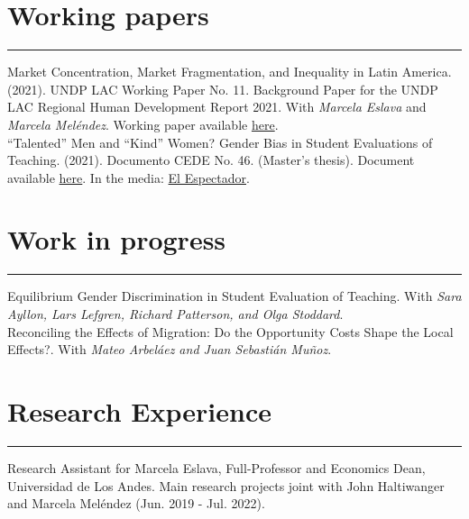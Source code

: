 \documentclass[12pt, letterpaper]{article}
\begin{document}
\vspace*{-4mm}

\section*{Working papers}
\vspace*{-8mm}
\noindent \rule{\linewidth}{0.2mm}

\noindent Market Concentration, Market Fragmentation, and Inequality in Latin America. (2021). UNDP LAC Working Paper No. 11. Background Paper for the UNDP LAC Regional Human Development Report 2021.  With \textit{Marcela Eslava} and \textit{Marcela Meléndez}. Working paper available \href{https://www.latinamerica.undp.org/content/rblac/en/home/library/poverty/market-concentration--market-fragmentation--and-inequality-in-la.html}{here}. \\ [-3mm]

\noindent ``Talented'' Men and ``Kind'' Women? Gender Bias in Student Evaluations of Teaching. (2021). Documento CEDE No. 46. (Master's thesis). Document available \href{https://papers.ssrn.com/sol3/papers.cfm?abstract_id=3919797}{here}. In the media: \href{https://www.elespectador.com/educacion/los-profes-crack-y-las-profes-amables-el-sesgo-de-genero-en-las-aulas/}{El Espectador}.

\vspace{-5mm}

\section*{Work in progress}
\vspace*{-8mm}
\noindent \rule{\linewidth}{0.2mm}
\noindent Equilibrium Gender Discrimination in Student Evaluation of Teaching. With \textit{Sara Ayllon, Lars Lefgren, Richard Patterson, and Olga Stoddard}. \\ [-3mm]

\noindent Reconciling the Effects of Migration: Do the Opportunity Costs Shape the Local Effects?. With \textit{Mateo Arbeláez and Juan Sebastián Muñoz}. \\ [-3mm]

\vspace{-6mm}

\section*{Research Experience}
\vspace*{-8mm}
\noindent \rule{\linewidth}{0.2mm}
\noindent
Research Assistant for Marcela Eslava, Full-Professor and Economics Dean, Universidad de Los Andes. Main research projects joint with John Haltiwanger and Marcela Meléndez (Jun. 2019 - Jul. 2022).  \\ 
\end{document}
